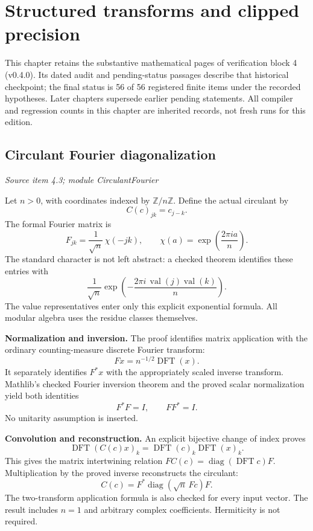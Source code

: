 \clearpage\FloatBarrier\section{Structured transforms and clipped precision}\label{supp4:section:001}
This chapter retains the substantive mathematical pages of verification block 4 (v0.4.0). Its dated audit and pending-status passages describe that historical checkpoint; the final status is 56 of 56 registered finite items under the recorded hypotheses. Later chapters supersede earlier pending statements. All compiler and regression counts in this chapter are inherited records, not fresh runs for this edition.\par

\subsection{Circulant Fourier diagonalization}\label{supp4:subsection:001}\textit{Source item 4.3; module CirculantFourier}\par
Let $n>0$, with coordinates indexed by $\mathbb Z/n\mathbb Z$. Define the actual circulant by
\[
C(c)_{jk}=c_{j-k}.
\]
The formal Fourier matrix is
\[
F_{jk}=\frac{1}{\sqrt n}\,\chi(-jk),
\qquad
\chi(a)=\exp\!\left(\frac{2\pi i a}{n}\right).
\]
The standard character is not left abstract: a checked theorem identifies these entries with
\[
\frac{1}{\sqrt n}\exp\!\left(-\frac{2\pi i\,\operatorname{val}(j)\operatorname{val}(k)}n\right).
\]
The value representatives enter only this explicit exponential formula. All modular algebra uses the residue classes themselves.

\textbf{Normalization and inversion.} The proof identifies matrix application with the ordinary counting-measure discrete Fourier transform:
\[
Fx=n^{-1/2}\operatorname{DFT}(x).
\]
It separately identifies $F^*x$ with the appropriately scaled inverse transform. Mathlib's checked Fourier inversion theorem and the proved scalar normalization yield both identities
\[
\boxed{F^*F=I,\qquad FF^*=I.}
\]
No unitarity assumption is inserted.

\textbf{Convolution and reconstruction.} An explicit bijective change of index proves
\[
\operatorname{DFT}(C(c)x)_k
=\operatorname{DFT}(c)_k\operatorname{DFT}(x)_k.
\]
This gives the matrix intertwining relation $FC(c)=\operatorname{diag}(\operatorname{DFT}c)F$. Multiplication by the proved inverse reconstructs the circulant:
\[
\boxed{C(c)=F^*\operatorname{diag}(\sqrt n\,Fc)F.}
\]
The two-transform application formula is also checked for every input vector. The result includes $n=1$ and arbitrary complex coefficients. Hermiticity is not required.

